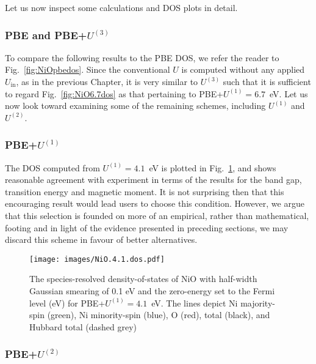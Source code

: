 Let us now inspect some calculations 
and DOS plots in detail.


\subsubsection{PBE and PBE+$U^{(3)}$} 
To compare the following results to the PBE DOS, 
we refer the reader to Fig.~\ref{fig:NiOpbedos}.
%
Since the conventional $U$ is computed 
without any applied $U_\textrm{in}$, 
as in the previous Chapter, 
it is very similar to $U^{(3)}$ 
such that it is sufficient to regard 
Fig.~\ref{fig:NiO6.7dos} 
as that pertaining to PBE+$U^{(1)}=6.7$~eV.
% 
Let us now look toward examining 
some of the remaining schemes, 
including $U^{(1)}$ and  $U^{(2)}$.

\subsubsection{PBE+$U^{(1)}$} 

The DOS computed from $U^{(1)}=4.1$~eV 
is plotted in Fig.~\ref{fig:NiO.4.1.dos}, 
and shows reasonable agreement with experiment 
in terms of the results 
for the band gap, transition energy and 
magnetic moment.
% 
It is not surprising then that this encouraging result
would lead users to choose this condition.
%
However, we argue that this selection 
is founded on more of an empirical, 
rather than mathematical, footing 
and in light of the evidence presented in preceding sections,  
we may discard this scheme  
in favour of better alternatives.

\begin{figure}[th!]
\centering
\texttt{[image: images/NiO.4.1.dos.pdf]}
\caption[NiO DOS with $U=4.1$~eV and $J=0$~eV]
{The species-resolved density-of-states of NiO 
with half-width Gaussian smearing of 0.1 eV 
and the zero-energy set to the Fermi level (eV) for  
PBE+$U^{(1)}=4.1$~eV.
%
The lines depict    
Ni majority-spin (green), 
Ni minority-spin (blue), 
O (red), 
total (black), 
and Hubbard total (dashed grey)}
\label{fig:NiO.4.1.dos}
\end{figure}



\subsubsection{PBE+$U^{(2)}$}

